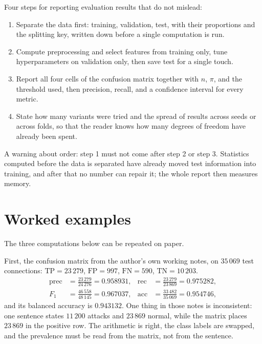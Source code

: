 \begin{resep}
Four steps for reporting evaluation results that do not mislead:
\begin{enumerate}
  \item Separate the data first: training, validation, test, with their proportions and the
        splitting key, written down before a single computation is run.
  \item Compute preprocessing and select features from training only, tune hyperparameters on
        validation only, then save test for a single touch.
  \item Report all four cells of the confusion matrix together with $n$, $\pi$, and the threshold
        used, then precision, recall, and a confidence interval for every metric.
  \item State how many variants were tried and the spread of results across seeds or across folds,
        so that the reader knows how many degrees of freedom have already been spent.
\end{enumerate}
A warning about order: step 1 must not come after step 2 or step 3. Statistics computed before the
data is separated have already moved test information into training, and after that no number can
repair it; the whole report then measures memory.
\end{resep}

\section{Worked examples}

The three computations below can be repeated on paper.

First, the confusion matrix from the author's own working notes, on $35\,069$ test connections:
$\mathrm{TP}=23\,279$, $\mathrm{FP}=997$, $\mathrm{FN}=590$, $\mathrm{TN}=10\,203$.
\begin{align*}
\operatorname{prec}&=\frac{23\,279}{24\,276}=0.958931, &
\operatorname{rec}&=\frac{23\,279}{23\,869}=0.975282,\\
F_1&=\frac{46\,558}{48\,145}=0.967037, &
\mathrm{acc}&=\frac{33\,482}{35\,069}=0.954746,
\end{align*}
and its balanced accuracy is $0.943132$. One thing in those notes is inconsistent: one sentence
states $11\,200$ attacks and $23\,869$ normal, while the matrix places $23\,869$ in the positive
row. The arithmetic is right, the class labels are swapped, and the prevalence must be read from
the matrix, not from the sentence.

